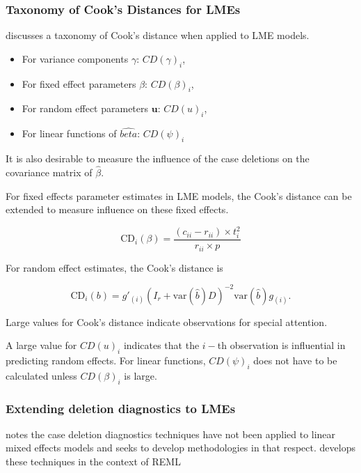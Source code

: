 \documentclass[12pt, a4paper]{report}
\theoremstyle{plain}
\theoremstyle{definition}
\theoremstyle{remark}
\begin{document}
\subsubsection{Taxonomy of Cook's Distances for LMEs}
	\citet{schabenberger} discusses a taxonomy of Cook's distance when applied to LME models. \begin{itemize}
		\item For variance components $\gamma$: $CD(\gamma)_i$,
		\item For fixed effect parameters $\beta$: $CD(\beta)_i$,
		\item For random effect parameters $\boldsymbol{u}$: $CD(u)_i$,
		\item For linear functions of $\hat{beta}$: $CD(\psi)_i$
	\end{itemize}			

	
	
	It is also desirable to measure the influence of the case deletions on the covariance matrix of $\hat{\beta}$.
	
	For fixed effects parameter estimates in LME models, the  Cook's distance can be extended to measure influence on these fixed effects.
	
	\[
	\mbox{CD}_{i}(\beta) = \frac{(c_{ii} - r_{ii}) \times t^2_{i}}{r_{ii} \times p}
	\]

	
	For random effect estimates, the  Cook's distance is
	
	\[
	\mbox{CD}_{i}(b) = g{\prime}_{(i)} (I_{r} + \mbox{var}(\hat{b})D)^{-2}\mbox{var}(\hat{b})g_{(i)}.
	\]
	
	Large values for Cook's distance indicate observations for special attention.
	
	A large value for $CD(u)_i$ indicates that the $i-$th observation is influential in predicting random effects.
	For linear functions, $CD(\psi)_i$ does not have to be calculated unless $CD(\beta)_i$ is large.

	
	
\subsubsection{Extending deletion diagnostics to LMEs}
	
	
	\citet{Christensen} notes the case deletion diagnostics techniques have not been applied to linear mixed effects models and seeks to develop methodologies in that respect. \citet{Christensen} develops these techniques in the context of REML
	
\end{document}
